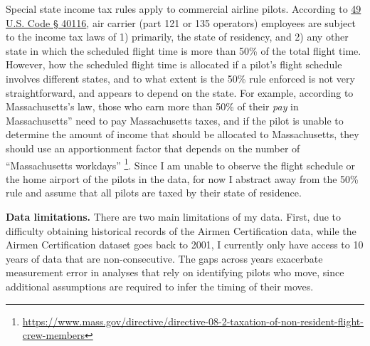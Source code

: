 \documentclass[11pt]{article}
\begin{document}
 Special state income tax rules apply to commercial airline pilots. According to \href{https://www.law.cornell.edu/uscode/text/49/40116}{49 U.S. Code § 40116}, air carrier (part 121 or 135 operators) employees are subject to the income tax laws of 1) primarily, the state of residency, and 2) any other state in which the scheduled flight time is more than 50\% of the total flight time. However, how the scheduled flight time is allocated if a pilot's flight schedule involves different states, and to what extent is the 50\% rule enforced is not very straightforward, and appears to depend on the state. For example, according to Massachusetts's law, those who earn more than 50\% of their \emph{pay} in Massachusetts'' need to pay Massachusetts taxes, and if the pilot is unable to determine the amount of income that should be allocated to  Massachusetts, they should use an apportionment factor that depends on the number of ``Massachusetts workdays'' \footnote{\url{https://www.mass.gov/directive/directive-08-2-taxation-of-non-resident-flight-crew-members}}. Since I am unable to observe the flight schedule or the home airport of the pilots in the data, for now I abstract away from the 50\% rule and assume that all pilots are taxed by their state of residence. 

\textbf{Data limitations.} There are two main limitations of my data. First, due to difficulty obtaining historical records of the Airmen Certification data, while the Airmen Certification dataset goes back to 2001, I currently only have access to 10 years of data that are non-consecutive. The gaps across years exacerbate measurement error in analyses that rely on identifying pilots who move, since additional assumptions are required to infer the timing of their moves.
\end{document}
